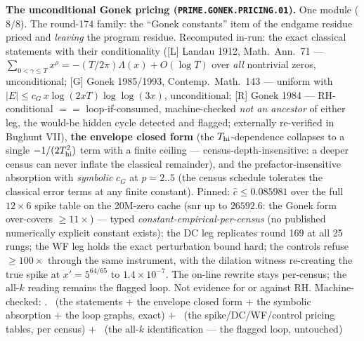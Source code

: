 \documentclass[11pt,a4paper]{article}
\theoremstyle{definition}
\begin{document}
\par\smallskip\noindent\textbf{The unconditional Gonek pricing
(\texttt{PRIME.\allowbreak GONEK.\allowbreak PRICING.01}).}
One module ($8/8$).  The round-174 family: the ``Gonek
constants'' item of the endgame residue priced and \emph{leaving}
the program residue.  Recomputed in-run: the exact classical
statements with their conditionality ([L] Landau 1912, Math.\
Ann.\ 71 --- $\sum_{0 < \gamma \le T} x^{\rho} = -(T/2\pi)
\Lambda(x) + O(\log T)$ over \emph{all} nontrivial zeros,
unconditional; [G] Gonek 1985/1993, Contemp.\ Math.\ 143 ---
uniform with $|E| \le c_G\,x \log(2xT) \log\log(3x)$,
unconditional; [R] Gonek 1984 --- RH-conditional $==$
loop-if-consumed, machine-checked \emph{not an ancestor} of
either leg, the would-be hidden cycle detected and flagged;
externally re-verified in Bughunt VII), \textbf{the envelope
closed form} (the $T_{\rm hi}$-dependence collapses to a single
$-1/(2T_{\rm hi}^2)$ term with a finite ceiling ---
census-depth-insensitive: a deeper census can never inflate the
classical remainder), and the prefactor-insensitive absorption
with \emph{symbolic} $c_G$ at $p = 2..5$ (the census schedule
tolerates the classical error terms at any finite constant).
Pinned: $\hat c \le 0.085981$ over the full $12 \times 6$ spike
table on the 20M-zero cache (snr up to $26592.6$: the Gonek form
over-covers $\ge 11\times$) --- typed
\emph{constant-empirical-per-census} (no published numerically
explicit constant exists); the DC leg replicates round 169 at
all 25 rungs; the WF leg holds the exact perturbation bound
hard; the controls refuse $\ge 100\times$ through the same
instrument, with the dilation witness re-creating the true spike
at $x' = 5^{64/65}$ to $1.4\times10^{-7}$.  The on-line rewrite
stays per-census; the all-$k$ reading remains the flagged loop.
Not evidence for or against RH.
Machine-checked:
.
\mE\ (the statements $+$ the envelope closed form $+$ the
symbolic absorption $+$ the loop graphs, exact) $+$ \mC\ (the
spike/DC/WF/control pricing tables, per census) $+$ \mO\ (the
all-$k$ identification --- the flagged loop, untouched)
\par\smallskip
\end{document}
